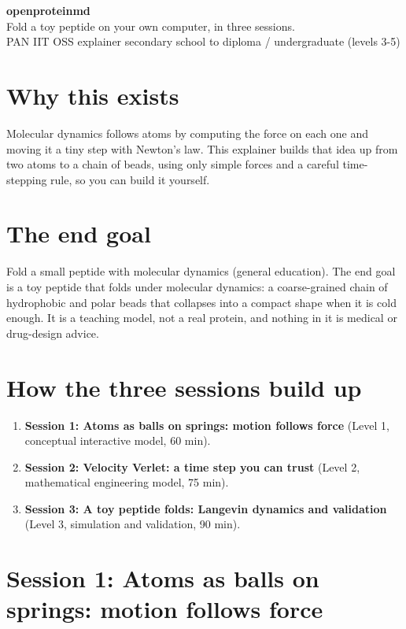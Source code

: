\documentclass[11pt,a4paper]{article}
\begin{document}
\begin{center}{\LARGE\bfseries openproteinmd}\\[0.4em]{\large Fold a toy peptide on your own computer, in three sessions.}\\[0.2em]\small PAN IIT OSS explainer \textbullet{} secondary school to diploma / undergraduate (levels 3-5)\end{center}

\section*{Why this exists}
Molecular dynamics follows atoms by computing the force on each one and moving it a tiny step with Newton's law. This explainer builds that idea up from two atoms to a chain of beads, using only simple forces and a careful time-stepping rule, so you can build it yourself.

\section*{The end goal}
Fold a small peptide with molecular dynamics (general education). The end goal is a toy peptide that folds under molecular dynamics: a coarse-grained chain of hydrophobic and polar beads that collapses into a compact shape when it is cold enough. It is a teaching model, not a real protein, and nothing in it is medical or drug-design advice.

\section*{How the three sessions build up}
\begin{enumerate}[nosep]
\item \textbf{Session 1: Atoms as balls on springs: motion follows force} (Level 1, conceptual interactive model, 60 min).
\item \textbf{Session 2: Velocity Verlet: a time step you can trust} (Level 2, mathematical engineering model, 75 min).
\item \textbf{Session 3: A toy peptide folds: Langevin dynamics and validation} (Level 3, simulation and validation, 90 min).
\end{enumerate}

\section{Session 1: Atoms as balls on springs: motion follows force}
\end{document}
